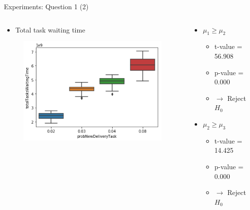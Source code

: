 \begin{frame}{Experiments: Question 1 (2)}
    \begin{columns}

        \begin{column}{0.5\textwidth}
            \begin{itemize}
                \item Total task waiting time
            \end{itemize}

            \begin{figure}[hbt]
                \includegraphics[width=1.1\textwidth]{imgs/question1-plot1}
            \end{figure}
        \end{column}

        \begin{column}{0.5\textwidth}
            \begin{itemize}
                \item $\mu_1 \geq \mu_2$
                    \begin{itemize}
                        \item t-value = 56.908
                        \item p-value = 0.000
                        \item $\rightarrow$ Reject $H_0$
                    \end{itemize}

                \item $\mu_2 \geq \mu_3$
                    \begin{itemize}
                        \item t-value = 14.425
                        \item p-value = 0.000
                        \item $\rightarrow$ Reject $H_0$
                    \end{itemize}


\end{itemize}
\end{column}
\end{columns}
\end{frame}
